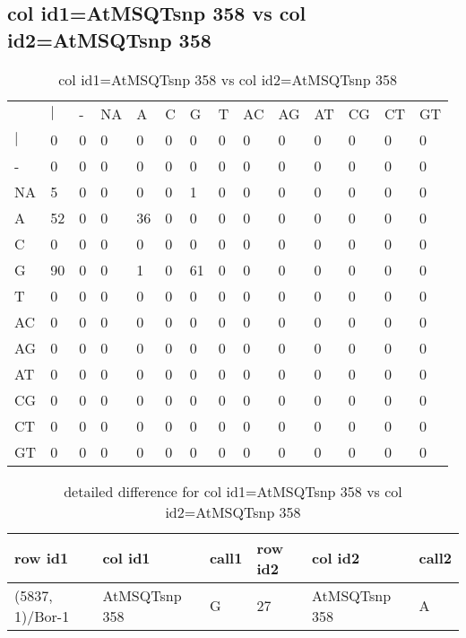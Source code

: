 \subsection{col id1=AtMSQTsnp 358 vs col id2=AtMSQTsnp 358}
\begin{center}
\begin{longtable}{|l|l|l|l|l|l|l|l|l|l|l|l|l|l|}
\caption{col id1=AtMSQTsnp 358 vs col id2=AtMSQTsnp 358} \label{table_dm684}\\
\hline
\\
\hline
&$|$&-&NA&A&C&G&T&AC&AG&AT&CG&CT&GT\\
$|$&0&0&0&0&0&0&0&0&0&0&0&0&0\\
-&0&0&0&0&0&0&0&0&0&0&0&0&0\\
NA&5&0&0&0&0&1&0&0&0&0&0&0&0\\
A&52&0&0&36&0&0&0&0&0&0&0&0&0\\
C&0&0&0&0&0&0&0&0&0&0&0&0&0\\
G&90&0&0&1&0&61&0&0&0&0&0&0&0\\
T&0&0&0&0&0&0&0&0&0&0&0&0&0\\
AC&0&0&0&0&0&0&0&0&0&0&0&0&0\\
AG&0&0&0&0&0&0&0&0&0&0&0&0&0\\
AT&0&0&0&0&0&0&0&0&0&0&0&0&0\\
CG&0&0&0&0&0&0&0&0&0&0&0&0&0\\
CT&0&0&0&0&0&0&0&0&0&0&0&0&0\\
GT&0&0&0&0&0&0&0&0&0&0&0&0&0\\
\hline
\end{longtable}
\end{center}

\begin{center}
\begin{longtable}{|l|l|l|l|l|l|}
\caption{detailed difference for col id1=AtMSQTsnp 358 vs col id2=AtMSQTsnp 358} \label{table_dm685}\\
\hline
row id1&col id1&call1&row id2&col id2&call2\\
\hline
(5837, 1)/Bor-1&AtMSQTsnp 358&G&27&AtMSQTsnp 358&A\\
\hline
\end{longtable}
\end{center}

